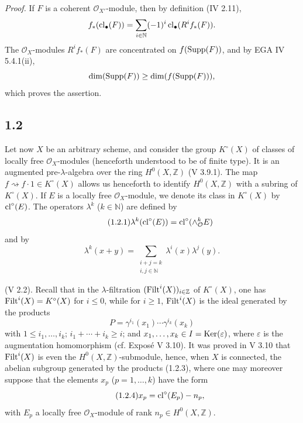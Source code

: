 \emph{Proof.}
If $F$ is a coherent $\mathcal O_{X'}$-module, then by definition (IV 2.11),
\[
f_*(\operatorname{cl}_\bullet(F))=
\sum_{i\in\mathbb N}(-1)^i\operatorname{cl}_\bullet(R^if_*(F)).
\]
The $\mathcal O_X$-modules $R^if_*(F)$ are concentrated on
$f(\operatorname{Supp}(F))$, and by EGA IV 5.4.1(ii),
\[
\dim(\operatorname{Supp}(F))\geq\dim(f(\operatorname{Supp}(F))),
\]
which proves the assertion.

\subsection*{1.2}
Let now $X$ be an arbitrary scheme, and consider the group $K^\circ(X)$ of
classes of locally free $\mathcal O_X$-modules (henceforth understood to be of
finite type). It is an augmented pre-$\lambda$-algebra over the ring
$H^0(X,\mathbb Z)$ (V 3.9.1). The map
$f\rightsquigarrow f\cdot1\in K^\circ(X)$ allows us henceforth to identify
$H^0(X,\mathbb Z)$ with a subring of $K^\circ(X)$. If $E$ is a locally free
$\mathcal O_X$-module, we denote its class in $K^\circ(X)$ by
$\operatorname{cl}^\circ(E)$. The operators $\lambda^k$ ($k\in\mathbb N$) are defined by
\begin{equation}\tag{1.2.1}
\lambda^k(\operatorname{cl}^\circ(E))=\operatorname{cl}^\circ(\wedge_{\mathcal O}^kE)
\end{equation}
and by
\begin{equation}\tag{1.2.2}
\lambda^k(x+y)=
\sum_{\substack{i+j=k\\ i,j\in\mathbb N}}\lambda^i(x)\lambda^j(y).
\end{equation}

(V 2.2). Recall that in the $\lambda$-filtration
$(\operatorname{Filt}^i(X))_{i\in\mathbb Z}$ of $K^\circ(X)$, one has
$\operatorname{Filt}^i(X)=K^\circ(X)$ for $i\leq0$, while for $i\geq1$, $\operatorname{Filt}^i(X)$ is
the ideal generated by the products
\begin{equation}\tag{1.2.3}
P=\gamma^{i_1}(x_1)\cdots\gamma^{i_k}(x_k)
\end{equation}
with $1\leq i_1,\ldots,i_k$; $i_1+\cdots+i_k\geq i$; and
$x_1,\ldots,x_k\in I=\operatorname{Ker}(\varepsilon)$, where $\varepsilon$ is the
augmentation homomorphism (cf. Expos\'e V 3.10). It was proved in V 3.10 that
$\operatorname{Filt}^i(X)$ is even the $H^0(X,\mathbb Z)$-submodule, hence, when $X$ is
connected, the abelian subgroup generated by the products (1.2.3), where one
may moreover suppose that the elements $x_p$ ($p=1,\ldots,k$) have the form
\begin{equation}\tag{1.2.4}
x_p=\operatorname{cl}^\circ(E_p)-n_p,
\end{equation}
with $E_p$ a locally free $\mathcal O_X$-module of rank
$n_p\in H^0(X,\mathbb Z)$.

